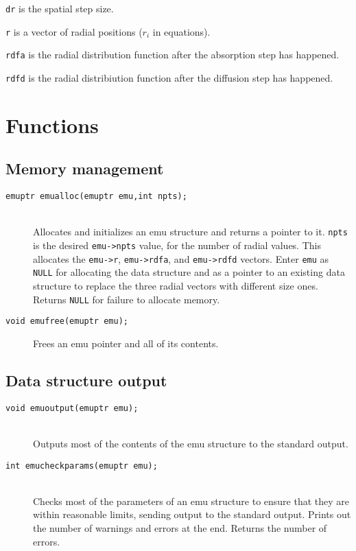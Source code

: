 \documentclass {book}
\begin{document}
\texttt{dr} is the spatial step size.

\texttt{r} is a vector of radial positions ($r_i$ in equations).

\texttt{rdfa} is the radial distribution function after the absorption step has happened.

\texttt{rdfd} is the radial distribiution function after the diffusion step has happened.

\bigskip
\section{Functions}

\subsection{Memory management}

\begin{description}

\item[\texttt{emuptr emualloc(emuptr emu,int npts);}]
\hfill \\
Allocates and initializes an emu structure and returns a pointer to it. \texttt{npts} is the desired \texttt{emu->npts} value, for the number of radial values. This allocates the \texttt{emu->r}, \texttt{emu->rdfa}, and \texttt{emu->rdfd} vectors. Enter \texttt{emu} as \texttt{NULL} for allocating the data structure and as a pointer to an existing data structure to replace the three radial vectors with different size ones. Returns \texttt{NULL} for failure to allocate memory.

\item[\texttt{void emufree(emuptr emu);}]
Frees an emu pointer and all of its contents.

\end{description}

\subsection{Data structure output}

\begin{description}

\item[\texttt{void emuoutput(emuptr emu);}]
\hfill \\
Outputs most of the contents of the emu structure to the standard output.

\item[\texttt{int emucheckparams(emuptr emu);}]
\hfill \\
Checks most of the parameters of an emu structure to ensure that they are within reasonable limits, sending output to the standard output. Prints out the number of warnings and errors at the end. Returns the number of errors.

\end{description}
\end{document}
